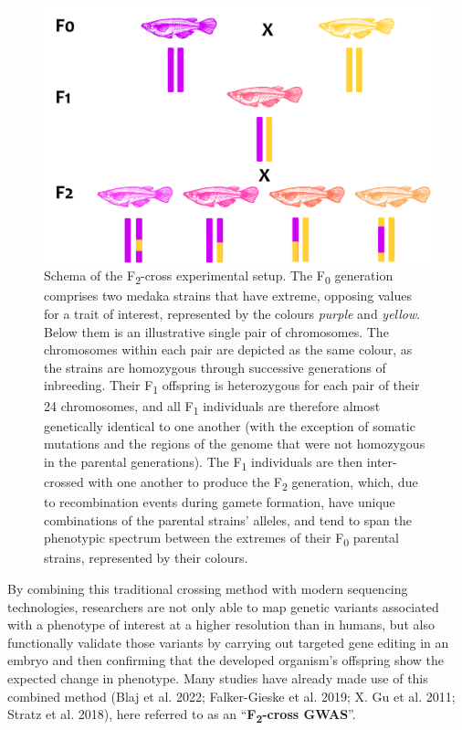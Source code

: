 \documentclass[
]{book}
\begin{document}
\begin{figure}
\includegraphics[width=1\linewidth]{figs/mikk_behaviour/F2-cross-schema} \caption{Schema of the F\textsubscript{2}-cross experimental setup. The F\textsubscript{0} generation comprises two medaka strains that have extreme, opposing values for a trait of interest, represented by the colours \emph{purple} and \emph{yellow}. Below them is an illustrative single pair of chromosomes. The chromosomes within each pair are depicted as the same colour, as the strains are homozygous through successive generations of inbreeding. Their F\textsubscript{1} offspring is heterozygous for each pair of their 24 chromosomes, and all F\textsubscript{1} individuals are therefore almost genetically identical to one another (with the exception of somatic mutations and the regions of the genome that were not homozygous in the parental generations). The F\textsubscript{1} individuals are then inter-crossed with one another to produce the F\textsubscript{2} generation, which, due to recombination events during gamete formation, have unique combinations of the parental strains' alleles, and tend to span the phenotypic spectrum between the extremes of their F\textsubscript{0} parental strains, represented by their colours.}\label{fig:F2-cross-schema}
\end{figure}

By combining this traditional crossing method with modern sequencing technologies, researchers are not only able to map genetic variants associated with a phenotype of interest at a higher resolution than in humans, but also functionally validate those variants by carrying out targeted gene editing in an embryo and then confirming that the developed organism's offspring show the expected change in phenotype. Many studies have already made use of this combined method (Blaj et al. 2022; Falker-Gieske et al. 2019; X. Gu et al. 2011; Stratz et al. 2018), here referred to as an ``\textbf{F\textsubscript{2}-cross GWAS}''.
\end{document}
